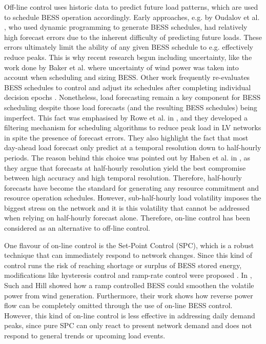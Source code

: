 Off-line control uses historic data to predict future load patterns, which are used to schedule BESS operation accordingly.
Early approaches, e.g. by Oudalov et al. \cite{Oudalov2007}, who used dynamic programming to generate BESS schedules, had relatively high forecast errors due to the inherent difficulty of predicting future loads.
These errors ultimately limit the ability of any given BESS schedule to e.g. effectively reduce peaks.
This is why recent research begun including uncertainty, like the work done by Baker et al. \cite{Baker2017} where uncertainty of wind power was taken into account when scheduling and sizing BESS.
Other work frequently re-evaluates BESS schedules to control and adjust its schedules after completing individual decision epochs \cite{Wang2014a}.
Nonetheless, load forecasting remain a key component for BESS scheduling despite those load forecasts (and the resulting BESS schedules) being imperfect.
This fact was emphasised by Rowe et al. in \cite{Rowe2014a}, and they developed a filtering mechanism for scheduling algorithms to reduce peak load in LV networks in spite the presence of forecast errors.
They also highlight the fact that most day-ahead load forecast only predict at a temporal resolution down to half-hourly periods.
The reason behind this choice was pointed out by Haben et al. in \cite{Poghosyan2014, Haben2014}, as they argue that forecasts at half-hourly resolution yield the best compromise between high accuracy and high temporal resolution.
Therefore, half-hourly forecasts have become the standard for generating any resource commitment and resource operation schedules.
However, sub-half-hourly load volatility imposes the biggest stress on the network and it is this volatility that cannot be addressed when relying on half-hourly forecast alone.
Therefore, on-line control has been considered as an alternative to off-line control.

One flavour of on-line control is the Set-Point Control (SPC), which is a robust technique that can immediately respond to network changes.
Since this kind of control runs the risk of reaching shortage or surplus of BESS stored energy, modifications like hysteresis control and ramp-rate control were proposed \cite{Gybel2012, Blaabjerg2006, Malesani1990, Xu2011a, Such2012}.
In \cite{Such2012}, Such and Hill showed how a ramp controlled BESS could smoothen the volatile power from wind generation.
Furthermore, their work shows how reverse power flow can be completely omitted through the use of on-line BESS control.
However, this kind of on-line control is less effective in addressing daily demand peaks, since pure SPC can only react to present network demand and does not respond to general trends or upcoming load events.

